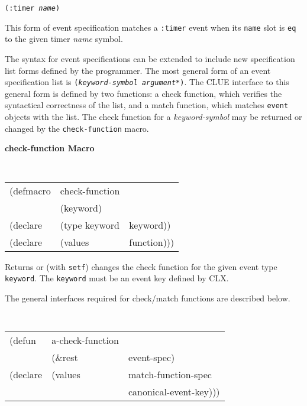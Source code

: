 {\samepage
{}
{\tt (:timer {\em name})}\\
\begin{flushright}
\parbox[t]{5.75in}{
This
form of event specification matches a {\tt :timer}
event when its {\tt name} slot is {\tt eq} to the given timer {\em name}
symbol.} \end{flushright}
}
 

The syntax for event specifications can be extended to include new
specification list forms defined by the programmer. 
The most general
form of an event specification list is {\tt ({\em keyword-symbol
argument*})}. The CLUE interface to this general form is defined by two
functions: a check function, which verifies the syntactical
correctness of the list, and a match function, which matches {\tt event}
objects with the list. The check  function for a {\em keyword-symbol}
may be returned or changed by the {\tt check-function} macro. 

{\samepage
{\large {\bf check-function \hfill Macro}} 
\begin{flushright} \parbox[t]{6.125in}{
\tt
\begin{tabular}{lll}
\raggedright
(defmacro & check-function & \\ 
& (keyword) \\
(declare &(type keyword & keyword))\\
(declare &(values  & function)))
\end{tabular}
\rm

}\end{flushright}}

\begin{flushright} \parbox[t]{6.125in}{
Returns or (with {\tt setf}) changes the check function for the given
event type {\tt keyword}. The {\tt keyword} must be an event key defined
by CLX.

}\end{flushright}


{\samepage
The general interfaces
required for  check/match functions are described below.


\begin{flushright} \parbox[t]{6.125in}{
\tt
\begin{tabular}{lll}
\raggedright
(defun & a-check-function & \\ 
& (\&rest & event-spec) \\
(declare &(values  & match-function-spec\\
         &         & canonical-event-key)))
\end{tabular}
\rm

}\end{flushright}}

